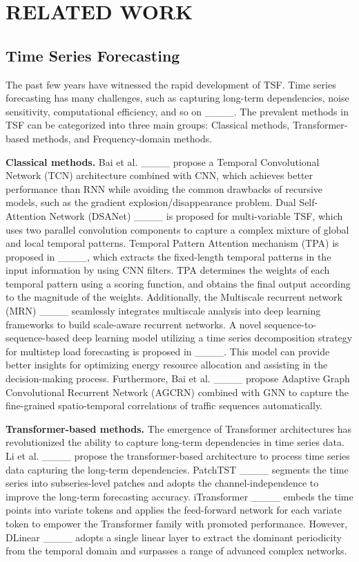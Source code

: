 \section{RELATED WORK}
\label{sec:Related Work}
\subsection{Time Series Forecasting}
The past few years have witnessed the rapid development of TSF. Time series forecasting has many challenges, such as capturing long-term dependencies, noise sensitivity, computational efficiency, and so on ____. The prevalent methods in TSF can be categorized into three main groups: Classical methods, Transformer-based methods, and Frequency-domain methods.

\textbf{Classical methods.} Bai et al. ____ propose a Temporal Convolutional Network (TCN) architecture combined with CNN, which achieves better performance than RNN while avoiding the common drawbacks of recursive models, such as the gradient explosion/disappearance problem.
Dual Self-Attention Network (DSANet) ____ is proposed for multi-variable TSF, which uses two parallel convolution components to capture a complex mixture of global and local temporal patterns.
Temporal Pattern Attention mechanism (TPA) is proposed in ____, which extracts the fixed-length temporal patterns in the input information by using CNN filters. TPA determines the weights of each temporal pattern using a scoring function, and obtains the final output according to the magnitude of the weights.
Additionally, the Multiscale recurrent network (MRN) ____ seamlessly integrates multiscale analysis into deep learning frameworks to build scale-aware recurrent networks.
A novel sequence-to-sequence-based deep learning model utilizing a time series decomposition strategy for multistep load forecasting is proposed in ____. This model can provide better insights for optimizing energy resource allocation and assisting in the decision-making process.
Furthermore, Bai et al. ____ propose Adaptive Graph Convolutional Recurrent Network (AGCRN) combined with GNN to capture the fine-grained spatio-temporal correlations of traffic sequences automatically.

\textbf{Transformer-based methods.} The emergence of Transformer architectures has revolutionized the ability to capture long-term dependencies in time series data. Li et al. ____ propose the transformer-based architecture to process time series data capturing the long-term dependencies. PatchTST ____ segments the time series into subseries-level patches and adopts the channel-independence to improve the long-term forecasting accuracy. iTransformer ____ embeds the time points into variate tokens and applies the feed-forward network for each variate token to empower the Transformer family with promoted performance. However, DLinear ____ adopts a single linear layer to extract the dominant periodicity from the temporal domain and surpasses a range of advanced complex networks.

